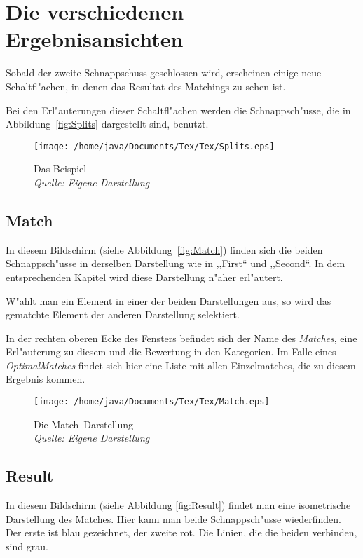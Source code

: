 \section{Die verschiedenen Ergebnisansichten}
Sobald der zweite Schnappschuss geschlossen wird, erscheinen einige neue Schaltfl"achen, in denen  das Resultat des Matchings zu sehen ist.

Bei den Erl"auterungen dieser Schaltfl"achen werden die Schnappsch"usse, die in Abbildung~\vref{fig:Splits} dargestellt sind, benutzt.
\begin{figure}
   \centering
   \texttt{[image: /home/java/Documents/Tex/Tex/Splits.eps]}
   \caption[Zeichnung von Flächen]{Das Beispiel\\\textit{Quelle: Eigene Darstellung}}
   \label{fig:Splits}
\end{figure}
\subsection{Match}
In diesem Bildschirm (siehe Abbildung~\vref{fig:Match}) finden sich die beiden Schnappsch"usse in derselben Darstellung wie in ,,First`` und ,,Second``. In dem entsprechenden Kapitel wird diese Darstellung n"aher erl"autert. 

W"ahlt man ein Element in einer der beiden Darstellungen aus, so wird das gematchte Element der anderen Darstellung selektiert. 

In der rechten oberen Ecke des Fensters befindet sich der Name des \textit{Matches}, eine Erl"auterung zu diesem und die Bewertung in den Kategorien. Im Falle eines \textit{OptimalMatches} findet sich hier eine Liste mit allen Einzelmatches, die zu diesem Ergebnis kommen.
\begin{figure}
   \centering
   \texttt{[image: /home/java/Documents/Tex/Tex/Match.eps]}
   \caption[Match--Darstellung]{Die Match--Darstellung \\\textit{Quelle: Eigene Darstellung}}
   \label{fig:Match}
\end{figure}

\subsection{Result}
In diesem Bildschirm (siehe Abbildung \vref{fig:Result}) findet man eine isometrische Darstellung des Matches. Hier kann man  beide Schnappsch"usse wiederfinden. Der erste ist blau gezeichnet, der zweite rot. Die Linien, die die beiden verbinden, sind grau. 


